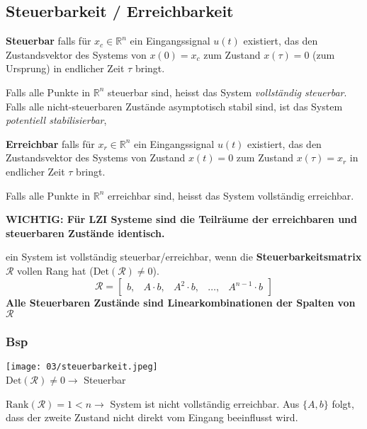         \subsection{Steuerbarkeit / Erreichbarkeit}
            \textbf{Steuerbar}
        falls für $x_c \in\mathbb{R}^n$ ein Eingangssignal $u(t)$ existiert, das den Zustandsvektor des Systems von $x(0) = x_c $ zum Zustand $x(\tau) = 0$ (zum Ursprung) in endlicher Zeit $\tau$ bringt. 
        
        Falls alle Punkte in $\mathbb{R}^n$ steuerbar sind, heisst das System \textit{ vollständig steuerbar}.
        Falls alle nicht-steuerbaren Zustände asymptotisch stabil sind, ist das System \textit{potentiell stabilisierbar}, 
        
        \textbf{Erreichbar} falls für $x_r \in\mathbb{R}^n$ ein Eingangssignal $u(t)$ existiert, das den Zustandsvektor des Systems von Zustand $x(t) = 0$ zum Zustand $x(\tau) = x_r$ in endlicher Zeit $\tau$ bringt.
        
        Falls alle Punkte in $\mathbb{R}^n$ erreichbar sind, heisst das System vollständig erreichbar.
        
        \textbf{WICHTIG: Für LZI Systeme sind die Teilräume der erreichbaren und steuerbaren Zustände identisch. }
        
        ein System ist vollständig steuerbar/erreichbar, wenn die \textbf{Steuerbarkeitsmatrix $\mathcal{R}$} vollen Rang hat ($\textrm{Det}(\mathcal{R})\neq0$). 
        \[\mathcal{R} = \begin{bmatrix} b, & A\cdot b, & A^2 \cdot b, & \hdots, & A^{n-1} \cdot b \end{bmatrix} \]
        \textbf{Alle Steuerbaren Zustände sind Linearkombinationen der Spalten von $\mathcal{R}$}
        
        \subsubsection{Bsp}
            \begin{center}
                \texttt{[image: 03/steuerbarkeit.jpeg]}\\
                $\displaystyle \textrm{Det}(\mathcal{R})\neq 0 \rightarrow$ Steuerbar
            \end{center}
            
            $\textrm{Rank}(\mathcal{R})=1<n\rightarrow$ System ist nicht vollständig erreichbar. Aus $\{A,b\}$ folgt, dass der zweite Zustand nicht direkt vom Eingang beeinflusst wird.
